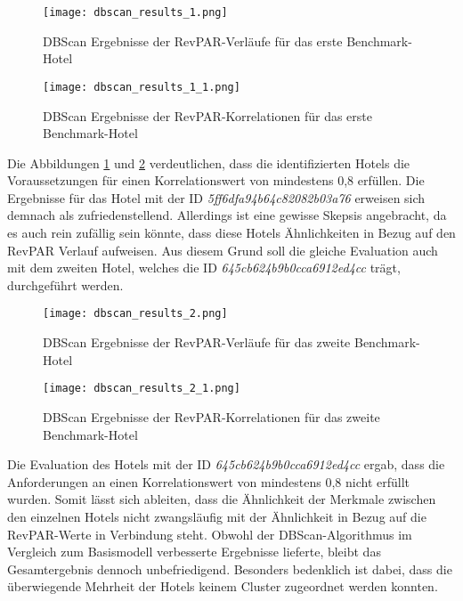 \begin{figure}[h]
    \centering
    \texttt{[image: dbscan\_results\_1.png]}
    \caption[DBScan Ergebnisse der RevPAR-Verläufe für das erste Benchmark-Hotel]{DBScan Ergebnisse der RevPAR-Verläufe für das erste Benchmark-Hotel}
    \label{img:dbscan_results_1}
\end{figure}

\begin{figure}[h]
    \centering
    \texttt{[image: dbscan\_results\_1\_1.png]}
    \caption[DBScan Ergebnisse der RevPAR-Korrelationen für das erste Benchmark-Hotel]{DBScan Ergebnisse der RevPAR-Korrelationen für das erste Benchmark-Hotel}
    \label{img:dbscan_results_1_1}
\end{figure}

Die Abbildungen \ref{img:dbscan_results_1} und \ref{img:dbscan_results_1_1} verdeutlichen, dass die identifizierten Hotels die Voraussetzungen für einen Korrelationswert von mindestens 0,8 erfüllen. Die Ergebnisse für das Hotel mit der ID \emph{5ff6dfa94b64c82082b03a76} erweisen sich demnach als zufriedenstellend. Allerdings ist eine gewisse Skepsis angebracht, da es auch rein zufällig sein könnte, dass diese Hotels Ähnlichkeiten in Bezug auf den RevPAR Verlauf aufweisen. Aus diesem Grund soll die gleiche Evaluation auch mit dem zweiten Hotel, welches die ID \emph{645cb624b9b0cca6912ed4cc} trägt, durchgeführt werden.

\begin{figure}[h]
    \centering
    \texttt{[image: dbscan\_results\_2.png]}
    \caption[DBScan Ergebnisse der RevPAR-Verläufe für das zweite Benchmark-Hotel]{DBScan Ergebnisse der RevPAR-Verläufe für das zweite Benchmark-Hotel}
    \label{img:dbscan_results_2}
\end{figure}
\newpage

\begin{figure}[h]
    \centering
    \texttt{[image: dbscan\_results\_2\_1.png]}
    \caption[DBScan Ergebnisse der RevPAR-Korrelationen für das zweiten Benchmark-Hotel]{DBScan Ergebnisse der RevPAR-Korrelationen für das zweite Benchmark-Hotel}
    \label{img:dbscan_results_2_1}
\end{figure}

Die Evaluation des Hotels mit der ID \emph{645cb624b9b0cca6912ed4cc} ergab, dass die Anforderungen an einen Korrelationswert von mindestens 0,8 nicht erfüllt wurden. Somit lässt sich ableiten, dass die Ähnlichkeit der Merkmale zwischen den einzelnen Hotels nicht zwangsläufig mit der Ähnlichkeit in Bezug auf die RevPAR-Werte in Verbindung steht. 
\newline
\newline
Obwohl der DBScan-Algorithmus im Vergleich zum Basismodell verbesserte Ergebnisse lieferte, bleibt das Gesamtergebnis dennoch unbefriedigend. Besonders bedenklich ist dabei, dass die überwiegende Mehrheit der Hotels keinem Cluster zugeordnet werden konnten.

